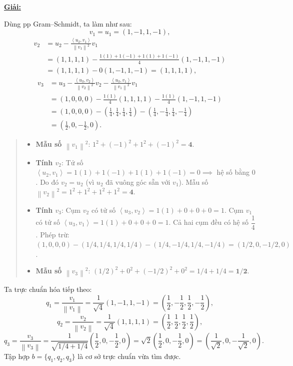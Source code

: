 \documentclass[12pt,a4paper]{article}
\newcommand{\ip}[2]{\left\langle #1,#2\right\rangle}
\newcommand{\norm}[1]{\left\|#1\right\|}
\begin{document}
\underline{\textbf{Giải:}}

Dùng pp Gram--Schmidt, ta làm như sau:
\[
v_1 = u_1 = (1, -1, 1, -1),
\]
\begin{align*}
v_2 &= u_2 - \frac{\ip{u_2}{v_1}}{\norm{v_1}^2}v_1 \\
    &= (1, 1, 1, 1) - \frac{1(1) + 1(-1) + 1(1) + 1(-1)}{4}(1, -1, 1, -1) \\
    &= (1, 1, 1, 1) - 0(1, -1, 1, -1) = (1, 1, 1, 1),
\end{align*}
\begin{align*}
v_3 &= u_3 - \frac{\ip{u_3}{v_2}}{\norm{v_2}^2}v_2 - \frac{\ip{u_3}{v_1}}{\norm{v_1}^2}v_1 \\
    &= (1, 0, 0, 0) - \frac{1(1)}{4}(1, 1, 1, 1) - \frac{1(1)}{4}(1, -1, 1, -1) \\
    &= (1, 0, 0, 0) - \left(\frac{1}{4}, \frac{1}{4}, \frac{1}{4}, \frac{1}{4}\right) - \left(\frac{1}{4}, -\frac{1}{4}, \frac{1}{4}, -\frac{1}{4}\right) \\
    &= \left(\frac{1}{2}, 0, -\frac{1}{2}, 0\right).
\end{align*}

\begin{quote}
\small
\noindent{}\par\vspace{3pt}
\begin{itemize}[noitemsep,topsep=2pt]
\item \textbf{Mẫu số $\norm{v_1}^2$}: $1^2 + (-1)^2 + 1^2 + (-1)^2 = \mathbf{4}$.
\item \textbf{Tính $v_2$}: Tử số $\ip{u_2}{v_1} = 1(1) + 1(-1) + 1(1) + 1(-1) = 0 \implies$ hệ số bằng $0$. Do đó $v_2 = u_2$ (vì $u_2$ đã vuông góc sẵn với $v_1$). Mẫu số $\norm{v_2}^2 = 1^2 + 1^2 + 1^2 + 1^2 = \mathbf{4}$.
\item \textbf{Tính $v_3$}: Cụm $v_2$ có tử số $\ip{u_3}{v_2} = 1(1) + 0 + 0 + 0 = 1$. Cụm $v_1$ có tử số $\ip{u_3}{v_1} = 1(1) + 0 + 0 + 0 = 1$. Cả hai cụm đều có hệ số $\dfrac{1}{4}$. Phép trừ: $(1, 0, 0, 0) - (1/4, 1/4, 1/4, 1/4) - (1/4, -1/4, 1/4, -1/4) = (1/2, 0, -1/2, 0)$.
\item \textbf{Mẫu số $\norm{v_3}^2$}: $(1/2)^2 + 0^2 + (-1/2)^2 + 0^2 = 1/4 + 1/4 = \mathbf{1/2}$.
\end{itemize}
\end{quote}

\vspace{0.2cm}
Ta trực chuẩn hóa tiếp theo:
\[
q_1 = \frac{v_1}{\norm{v_1}} = \frac{1}{\sqrt{4}}(1, -1, 1, -1) = \left(\frac{1}{2}, -\frac{1}{2}, \frac{1}{2}, -\frac{1}{2}\right),
\]
\[
q_2 = \frac{v_2}{\norm{v_2}} = \frac{1}{\sqrt{4}}(1, 1, 1, 1) = \left(\frac{1}{2}, \frac{1}{2}, \frac{1}{2}, \frac{1}{2}\right),
\]
\[
q_3 = \frac{v_3}{\norm{v_3}} = \frac{1}{\sqrt{1/4 + 1/4}}\left(\frac{1}{2}, 0, -\frac{1}{2}, 0\right) = \sqrt{2}\left(\frac{1}{2}, 0, -\frac{1}{2}, 0\right) = \left(\frac{1}{\sqrt{2}}, 0, -\frac{1}{\sqrt{2}}, 0\right).
\]
Tập hợp $b = \{q_1, q_2, q_3\}$ là cơ sở trực chuẩn vừa tìm được.
\end{document}
